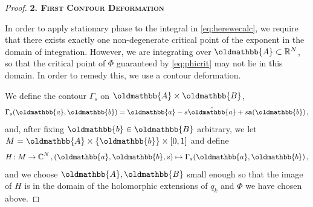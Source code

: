 \documentclass[
	fontsize=11pt, 
	twoside=false, 
	abstract=true, 
	a4paper,
]{scrartcl}
\newcommand{\RR}{\mathbb{R}}
\newcommand{\CC}{\mathbb{C}}
\newcommand{\dd}{\mathrm{d}}
\newcommand{\mf}[1]{\oldmathbb{#1}}
\newcommand{\bsc}[1]{\textbf{\ebgaramond\textsc{#1}}}
\begin{document}
\begin{proof}
	\bsc{2. First Contour Deformation}

	In order to apply stationary phase to the integral in \cref{eq:herewecalc}, we require that there exists exactly one non-degenerate critical point of the exponent in the domain of integration. However, we are integrating over $\mf{A} \subset \RR^{N}$, so that the critical point of $\Phi$ guaranteed by \cref{eq:phicrit} may not lie in this domain. In order to remedy this, we use a contour deformation.

	We define the contour $\Gamma_s$ on $\mf{A}\times\mf{B}$, %
	\[
		\Gamma_s(\mf{a},\mf{b}) = \mf{a}-s\hat{\mf{a}}+s\mathbf{a}(\mf{b})\,,%
	\]
	and, after fixing $\mf{b}\in\mf{B}$ arbitrary, we let $M = \mf{A}\times\{\mf{b}\}\times [0,1]$ and define %
	\[
		H \colon M \to \CC^{N}\,, (\mf{a},\mf{b},s)\mapsto\Gamma_s(\mf{a},\mf{b})\,,%
	\]
	and we choose $\mf{A},\mf{B}$ small enough so that the image of $H$ is in the domain of the holomorphic extensions of $q_k$ and $\Phi$ we have chosen above.



\end{proof}
\end{document}
